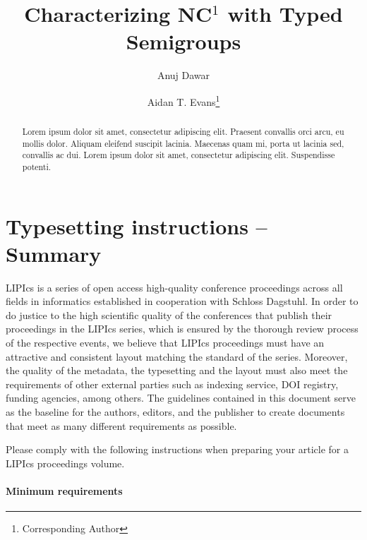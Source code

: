 \documentclass[a4paper,UKenglish,cleveref, autoref, thm-restate, anonymous]{lipics-v2021}
\title{Characterizing NC${}^1$ with Typed Semigroups} %
\author{Anuj Dawar}{Department of Computer Science and Technology, University of Cambridge, United Kingdom \and \url{https://www.cl.cam.ac.uk/~ad260/} }{anuj.dawar@cl.cam.ac.uk}{https://orcid.org/0000-0003-4014-8248}{(Optional) author-specific funding acknowledgements}%
\author{Aidan T. Evans\footnote{Corresponding Author}}{Department of Computer Science and Technology, University of Cambridge, United Kingdom \and \url{https://www.aidantevans.com/} }{ate26@cam.ac.uk}{https://orcid.org/0009-0007-9084-3608}{[funding]}
\begin{document}
\maketitle

\begin{abstract}
Lorem ipsum dolor sit amet, consectetur adipiscing elit. Praesent convallis orci arcu, eu mollis dolor. Aliquam eleifend suscipit lacinia. Maecenas quam mi, porta ut lacinia sed, convallis ac dui. Lorem ipsum dolor sit amet, consectetur adipiscing elit. Suspendisse potenti. 
\end{abstract}

\section{Typesetting instructions -- Summary}
\label{sec:typesetting-summary}

LIPIcs is a series of open access high-quality conference proceedings across all fields in informatics established in cooperation with Schloss Dagstuhl. 
In order to do justice to the high scientific quality of the conferences that publish their proceedings in the LIPIcs series, which is ensured by the thorough review process of the respective events, we believe that LIPIcs proceedings must have an attractive and consistent layout matching the standard of the series.
Moreover, the quality of the metadata, the typesetting and the layout must also meet the requirements of other external parties such as indexing service, DOI registry, funding agencies, among others. The guidelines contained in this document serve as the baseline for the authors, editors, and the publisher to create documents that meet as many different requirements as possible. 

Please comply with the following instructions when preparing your article for a LIPIcs proceedings volume. 
\paragraph*{Minimum requirements}
\end{document}
